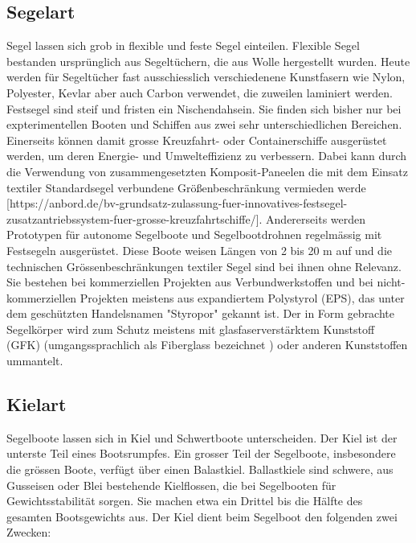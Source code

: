 \subsection{Segelart}
Segel lassen sich grob in flexible und feste Segel einteilen. Flexible Segel bestanden ursprünglich aus Segeltüchern, die aus  Wolle hergestellt wurden. Heute werden für Segeltücher fast ausschiesslich verschiedenene Kunstfasern wie Nylon, Polyester, Kevlar aber auch Carbon verwendet, die zuweilen laminiert werden. 
Festsegel sind steif und fristen ein Nischendahsein. Sie finden sich bisher nur bei expterimentellen Booten und Schiffen aus zwei sehr unterschiedlichen Bereichen. Einerseits können damit grosse Kreuzfahrt- oder Containerschiffe ausgerüstet werden, um deren Energie- und Umwelteffizienz zu verbessern. Dabei kann durch die Verwendung von zusammengesetzten Komposit-Paneelen die mit dem Einsatz textiler Standardsegel verbundene Größenbeschränkung vermieden werde [https://anbord.de/bv-grundsatz-zulassung-fuer-innovatives-festsegel-zusatzantriebssystem-fuer-grosse-kreuzfahrtschiffe/]. Andererseits werden Prototypen für autonome Segelboote und Segelbootdrohnen regelmässig mit Festsegeln ausgerüstet. Diese Boote weisen Längen von 2 bis 20 m auf und die technischen Grössenbeschränkungen textiler Segel sind bei ihnen ohne Relevanz. Sie bestehen bei kommerziellen Projekten aus Verbundwerkstoffen und bei nicht-kommerziellen Projekten meistens aus expandiertem Polystyrol (EPS), das unter dem geschützten Handelsnamen "Styropor" gekannt ist. Der in Form gebrachte Segelkörper wird zum Schutz meistens mit glasfaserverstärktem Kunststoff (GFK) (umgangssprachlich als Fiberglass bezeichnet ) oder anderen Kunststoffen ummantelt.  
\subsection{Kielart}
Segelboote lassen sich in Kiel und Schwertboote unterscheiden. Der Kiel ist der unterste Teil eines Bootsrumpfes. Ein grosser Teil der Segelboote, insbesondere die grössen Boote, verfügt über einen Balastkiel. Ballastkiele sind schwere, aus Gusseisen oder Blei bestehende Kielflossen, die bei Segelbooten für Gewichtsstabilität sorgen. Sie machen etwa ein Drittel bis die Hälfte des gesamten Bootsgewichts aus.
Der Kiel dient beim Segelboot den folgenden zwei Zwecken:

